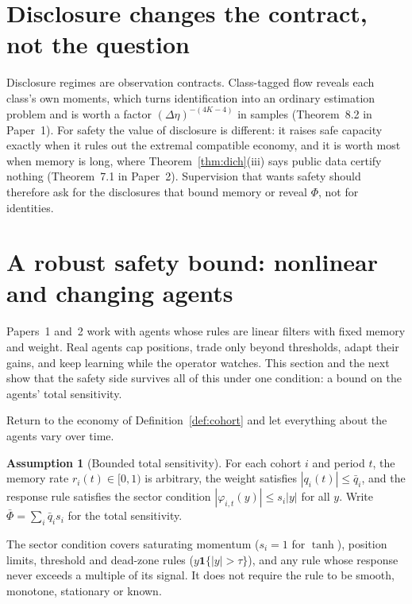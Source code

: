 \documentclass[11pt]{article}
\theoremstyle{definition}
\newtheorem{assumption}[theorem]{Assumption}
\theoremstyle{remark}
\begin{document}
\section{Disclosure changes the contract, not the question}\label{sec:fw_disclosure}

Disclosure regimes are observation contracts. Class-tagged flow reveals each class's own moments, which turns identification into an ordinary estimation problem and is worth a factor $(\Delta\eta)^{-(4K-4)}$ in samples (Theorem~\textup{8.2 in Paper~1}). For safety the value of disclosure is different: it raises safe capacity exactly when it rules out the extremal compatible economy, and it is worth most when memory is long, where Theorem~\ref{thm:dich}(iii) says public data certify nothing (Theorem~\textup{7.1 in Paper~2}). Supervision that wants safety should therefore ask for the disclosures that bound memory or reveal $\Phi$, not for identities.

\section{A robust safety bound: nonlinear and changing agents}\label{sec:bl_robust}

Papers~1 and~2 work with agents whose rules are linear filters with fixed memory and weight. Real agents cap positions, trade only beyond thresholds, adapt their gains, and keep learning while the operator watches. This section and the next show that the safety side survives all of this under one condition: a bound on the agents' total sensitivity.


Return to the economy of Definition~\ref{def:cohort} and let everything about the agents vary over time.

\begin{assumption}[Bounded total sensitivity]\label{ass:sector}
For each cohort $i$ and period $t$, the memory rate $r_i(t)\in[0,1)$ is arbitrary, the weight satisfies $|q_i(t)|\le\bar q_i$, and the response rule satisfies the sector condition $|\varphi_{i,t}(y)|\le s_i|y|$ for all $y$. Write $\bar\Phi=\sum_i\bar q_i s_i$ for the total sensitivity.
\end{assumption}

The sector condition covers saturating momentum ($s_i=1$ for $\tanh$), position limits, threshold and dead-zone rules ($y\mathbf 1\{|y|>\tau\}$), and any rule whose response never exceeds a multiple of its signal. It does not require the rule to be smooth, monotone, stationary or known.
\end{document}
